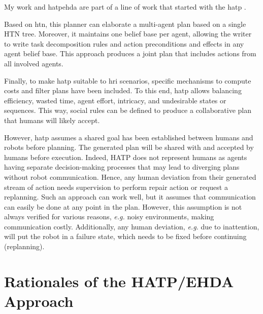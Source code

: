 My work and \acrshort{hatpehda} are part of a line of work that started with the \acrfull{hatp} \cite{alili2009task,lallement2014hatp}.

Based on \acrfull{htn}, this planner can elaborate a multi-agent plan based on a single HTN tree. Moreover, it maintains one belief base per agent, allowing the writer to write task decomposition rules and action preconditions and effects in any agent belief base. This approach produces a joint plan that includes actions from all involved agents. 

Finally, to make \acrshort{hatp} suitable to \acrshort{hri} scenarios, specific mechanisms to compute costs and filter plans have been included. To this end, \acrshort{hatp} allows balancing efficiency, wasted time, agent effort, intricacy, and undesirable states or sequences. This way, social rules can be defined to produce a collaborative plan that humans will likely accept. 

However, \acrshort{hatp} assumes a shared goal has been established between humans and robots before planning. The generated plan will be shared with and accepted by humans before execution. Indeed, HATP does not represent humans as agents having separate decision-making processes that may lead to diverging plans without robot communication. Hence, any human deviation from their generated stream of action needs supervision to perform repair action or request a replanning. Such an approach can work well, but it assumes that communication can easily be done at any point in the plan. However, this assumption is not always verified for various reasons, \textit{e.g.} noisy environments, making communication costly.
Additionally, any human deviation, \textit{e.g.} due to inattention, will put the robot in a failure state, which needs to be fixed before continuing (replanning).

\section{Rationales of the HATP/EHDA Approach}

